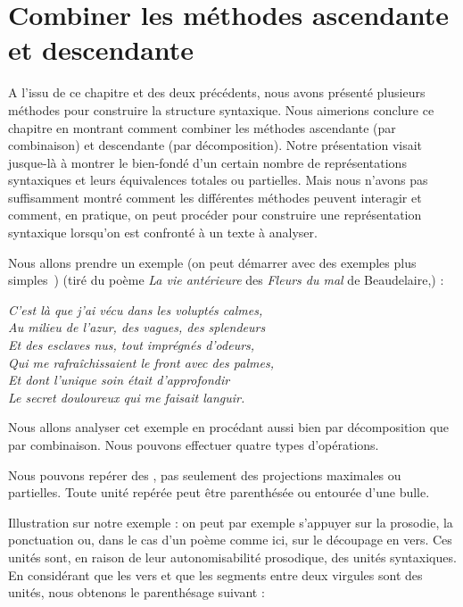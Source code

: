 \section{Combiner les méthodes ascendante et descendante}\label{sec:3.4.27}

A l’issu de ce chapitre et des deux précédents, nous avons présenté plusieurs méthodes pour construire la structure syntaxique. Nous aimerions conclure ce chapitre en montrant comment combiner les méthodes ascendante (par combinaison) et descendante (par décomposition). Notre présentation visait jusque-là à montrer le bien-fondé d’un certain nombre de représentations syntaxiques et leurs équivalences totales ou partielles. Mais nous n’avons pas suffisamment montré comment les différentes méthodes peuvent interagir et comment, en pratique, on peut procéder pour construire une représentation syntaxique lorsqu’on est confronté à un texte à analyser.


Nous allons prendre un exemple (on peut démarrer avec des exemples plus simples~\HappySmiley) (tiré du poème \textit{La vie antérieure} des \textit{Fleurs du mal} de Beaudelaire,) :

\ea\label{ex:beaudelaire}
\itshape
C’est là que j’ai vécu dans les voluptés calmes,\\
Au milieu de l’azur, des vagues, des splendeurs\\
Et des esclaves nus, tout imprégnés d’odeurs,\\
Qui me rafraîchissaient le front avec des palmes,\\
Et dont l’unique soin était d’approfondir\\
Le secret douloureux qui me faisait languir.
\z

Nous allons analyser cet exemple en procédant aussi bien par décomposition que par combinaison. Nous pouvons effectuer quatre types d’opérations.

\begin{tblsframed}{}
\noindent Nous pouvons repérer des , pas seulement des projections maximales ou partielles. Toute unité repérée peut être parenthésée ou entourée d’une bulle.
\end{tblsframed}

Illustration sur notre exemple : on peut par exemple s’appuyer sur la prosodie, la ponctuation ou, dans le cas d’un poème comme ici, sur le découpage en vers. Ces unités sont, en raison de leur autonomisabilité prosodique, des unités syntaxiques. En considérant que les vers et que les segments entre deux virgules sont des unités, nous obtenons le parenthésage suivant :

